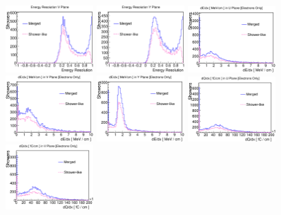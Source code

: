 \begin{figure}[htbp]
\begin{center}
\includegraphics[width=0.3\textwidth]{figs/ongoing/eminus/EnergyResV.eps}
\includegraphics[width=0.3\textwidth]{figs/ongoing/eminus/EnergyResY.eps}
\includegraphics[width=0.3\textwidth]{figs/ongoing/eminus/dEdxU.eps}
\includegraphics[width=0.3\textwidth]{figs/ongoing/eminus/dEdxV.eps}
\includegraphics[width=0.3\textwidth]{figs/ongoing/eminus/dEdxY.eps}
\includegraphics[width=0.3\textwidth]{figs/ongoing/eminus/dQdxU.eps}
\includegraphics[width=0.3\textwidth]{figs/ongoing/eminus/dQdxV.eps}

\end{center}
\end{figure}
